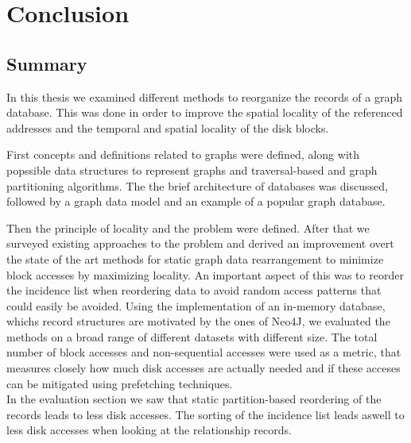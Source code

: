 \chapter{Conclusion}\label{\positionnumber}

\section{Summary}\label{\positionnumber}
In this thesis we examined different methods to reorganize the records of a graph database.
This was done in order to improve the spatial locality of the referenced addresses and the temporal and spatial locality of the disk blocks.

First concepts and definitions related to graphs were defined, along with popssible data structures to represent graphs and traversal-based and graph partitioning algorithms.
The the brief architecture of databases was discussed, followed by a graph data model and an example of a popular graph database.

Then the principle of locality and the problem were defined.
After that we surveyed existing approaches to the problem and derived an improvement overt the state of the art methods for static graph data rearrangement to minimize block accesses by maximizing locality.
An important aspect of this was to reorder the incidence list when reordering data to avoid random access patterns that could easily be avoided.
Using the implementation of an in-memory database, whichs record structures are motivated by the ones of Neo4J, we evaluated the methods on a broad range of different datasets with different size.
The total number of block accesses and non-sequential accesses were used as a metric, that measures closely how much disk accesses are actually needed and if these acceses can be mitigated using prefetching techniques.  \\

In the evaluation section we saw that static partition-based reordering of the records leads to less disk accesses.
The sorting of the incidence list leads aswell to less disk accesses when looking at the relationship records.

